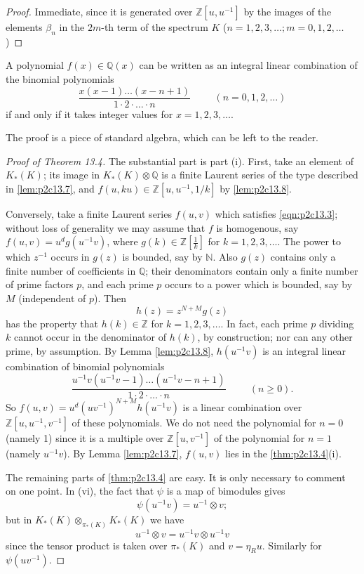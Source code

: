 \documentclass[../main]{subfiles}
\begin{document}
\begin{proof}
Immediate, since it is generated over $\mathbb{Z}[u,u^{-1}]$ by the images of the elements $\beta_n$ in the $2m$-th term of the spectrum $K$ ($n=1,2,3,\ldots; m=0,1,2,\ldots$)
\end{proof}
\begin{lemma}
\label{lem:p2c13.8}
A polynomial $f(x)\in\mathbb{Q}(x)$ can be written as an integral linear combination of the binomial polynomials $$\frac{x(x-1)\ldots(x-n+1)}{1\cdot 2 \cdot \ldots \cdot n}\hspace{1cm} (n=0,1,2,\dots)$$
if and only if it takes integer values for $x=1,2,3,\dots$.
\end{lemma}
The proof is a piece of standard algebra, which can be left to the
reader.
\begin{proof}[Proof of Theorem 13.4]
The substantial part is part (i). First, take an element of $K_\ast(K)$; its image in $K_\ast(K)\otimes\mathbb{Q}$ is a finite Laurent series of the type described in \eqref{lem:p2c13.7}, and $f(u, ku)\in \mathbb{Z}[u,u^{-1}, 1/k]$ by \eqref{lem:p2c13.8}.

Conversely, take a finite Laurent series $f(u,v)$ which satisfies \eqref{eqn:p2c13.3}; without loss of generality we may assume that $f$ is homogenous, say $f(u,v) = u^dg(u^{-1}v)$, where $g(k)\in\mathbb{Z}\left[\frac{1}{k}\right]$ for $k=1,2,3,\dots$. The power to which $z^{-1}$ occurs in $g(z)$ is bounded, say by $\mathbb{N}$. Also $g(z)$ contains only a finite number of coefficients in $\mathbb{Q}$; their denominators contain only a finite number of prime factors $p$, and each prime $p$ occurs to a power which is bounded, say by $M$ (independent of $p$). Then $$h(z) = z^{N+M}g(z)$$ has the property that $h(k) \in \mathbb{Z}$ for $k = 1,2,3,\dots$. In fact, each prime $p$ dividing $k$ cannot occur in the denominator of $h(k)$, by construction; nor can any other prime, by assumption. By Lemma \ref{lem:p2c13.8}, $h(u^{-1}v)$ is an integral linear combination of binomial polynomials $$\frac{u^{-1}v(u^{-1}v-1)\ldots(u^{-1}v-n+1)}{1\cdot 2 \cdot \ldots \cdot n}\hspace{1cm} (n\ge 0).$$ So $f(u,v) = u^d (uv^{-1})^{N+M}h(u^{-1}v)$ is a linear combination over $\mathbb{Z}[u,u^{-1},v^{-1}]$ of these polynomials. We do not need the polynomial for $n=0$ (namely 1) since it is a multiple over $\mathbb{Z}[u,v^{-1}]$ of the polynomial for $n=1$ (namely $u^{-1}v$). By Lemma \ref{lem:p2c13.7}, $f(u,v)$ lies in the \eqref{thm:p2c13.4}(i). 

The remaining parts of \eqref{thm:p2c13.4} are easy. It is only necessary to
comment on one point. In (vi), the fact that $\psi$ is a map of bimodules
gives $$\psi(u^{-1} v) = u^{-1}\otimes v;$$ but in $K_\ast(K)\otimes_{\pi_\ast(K)} K_\ast(K)$ we have $$u^{-1}\otimes v = u^{-1}v\otimes u^{-1}v$$ since the tensor product is taken over $\pi_\ast(K)$ and $v=\eta_R u$. Similarly for $\psi(uv^{-1})$.
\end{proof}
\end{document}
